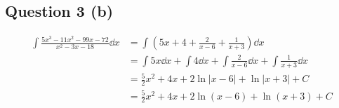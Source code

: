 \documentclass{tufte-handout}
\begin{document}
\begin{question}
\qpart
\subsection*{Question 3 (b)}

\clearpage

\qpart

\begin{align*}
\int \frac{5x^{3} - 11x^{2} - 99x - 72}{x^{2} - 3x - 18} \dd{x} &= \int \left(5x + 4 + \frac{2}{x - 6} + \frac{1}{x + 3}\right) \dd{x}\\[8pt]
&= \int 5x \dd{x} + \int 4 \dd{x} + \int \frac{2}{x - 6} \dd{x} + \int \frac{1}{x + 3} \dd{x}\\[8pt]
&= \frac{5}{2}x^{2} + 4x + 2\ln|x - 6| + \ln|x + 3| + C\\[8pt]
&= \frac{5}{2}x^{2} + 4x + 2\ln(x - 6) + \ln(x + 3) + C
\end{align*}

\end{question}

\clearpage
\end{document}
